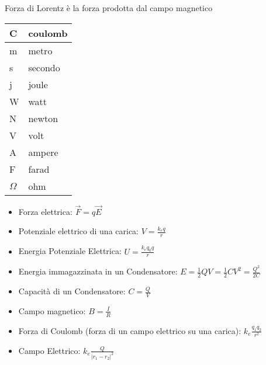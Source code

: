 \documentclass[14pt]{extarticle}
\begin{document}
Forza di Lorentz è la forza prodotta dal campo magnetico

    \begin{tabular}{l|l}
    C & coulomb \\ \hline
    m & metro   \\ \hline
    s & secondo \\ \hline
    j & joule   \\ \hline
    W & watt    \\ \hline
    N & newton  \\ \hline
    V & volt    \\ \hline
    A & ampere  \\ \hline
    F & farad   \\ \hline
    $\Omega$ & ohm    
    \end{tabular}





\begin{itemize}
    \item Forza elettrica: $\overrightarrow{F}=q\overrightarrow{E}$
    \item Potenziale elettrico di una carica: $V=\frac{k_eq}{r}$
    \item Energia Potenziale Elettrica: $U=\frac{k_eq_0q}{r}$
\end{itemize}

\begin{itemize}
    \item Energia immagazzinata in un Condensatore: $E=\frac{1}{2}QV=\frac{1}{2}CV^2=\frac{Q^2}{2C}$
    \item Capacità di un Condensatore: $C=\frac{Q}{V}$
    \item Campo magnetico: $B=\frac{I}{R}$
\end{itemize}

\begin{itemize}
    \item Forza di Coulomb (forza di un campo elettrico su una carica): $k_e\frac{q_1q_2}{r^2}$
    \item Campo Elettrico: $k_e\frac{Q}{|r_1-r_2|^2}$
    
\end{itemize}
\end{document}
